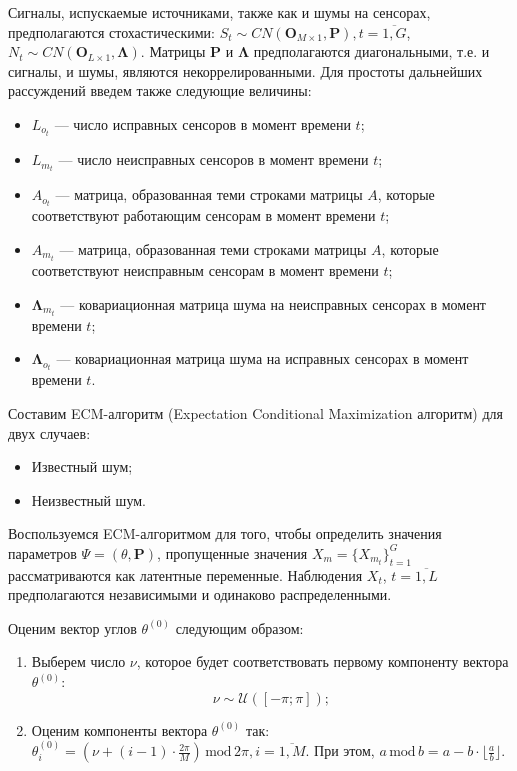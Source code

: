 \documentclass[11pt]{article}
\begin{document}
Сигналы, испускаемые источниками, также как и шумы на сенсорах, предполагаются стохастическими: $S_t \sim CN(\mathbf{O}_{M \times 1},\mathbf{P}),t=\overline{1,G}$, $N_t \sim CN(\mathbf{O}_{L \times 1}, \mathbf{\Lambda})$. Матрицы $\mathbf{P}$ и $\mathbf{\Lambda}$ предполагаются диагональными, т.е. и сигналы, и шумы, являются некоррелированными. Для простоты дальнейших рассуждений введем также следующие величины:
\begin{itemize}
\item
$L_{o_t}$ --- число исправных сенсоров в момент времени $t$;
\item
 $L_{m_t}$ --- число неисправных сенсоров в момент времени $t$;
\item 
$A_{o_t}$ --- матрица, образованная теми строками матрицы $A$, которые соответствуют работающим сенсорам в момент времени $t$; 
\item
$A_{m_t}$ --- матрица, образованная теми строками матрицы $A$, которые соответствуют неисправным сенсорам в момент времени $t$;
\item
$\mathbf{\Lambda}_{m_t}$ --- ковариационная матрица шума на неисправных сенсорах в момент времени $t$;
\item 
 $\mathbf{\Lambda}_{o_t}$ --- ковариационная матрица шума на исправных сенсорах в момент времени $t$.
\end{itemize}
Составим ECM-алгоритм (Expectation Conditional Maximization алгоритм) для двух случаев:
\begin{itemize}
\item
Известный шум;
\item
Неизвестный шум.
\end{itemize}
\clearpage
\begin{center}
\fontsize{16}{20}\selectfont {}
\end{center}
Воспользуемся ECM-алгоритмом для того, чтобы определить значения параметров $\Psi = (\theta, \mathbf{P})$, пропущенные значения $X_m=\{X_{m_t}\}_{t=1}^G$ рассматриваются как латентные переменные. Наблюдения $X_t$, $t=\overline{1,L}$ предполагаются независимыми и одинаково распределенными.
\begin{center}
\fontsize{14}{18}\selectfont {}
\end{center}
Оценим вектор углов $\theta^{(0)}$ следующим образом:
\begin{enumerate}
\item
Выберем число $\nu$, которое будет соответствовать первому компоненту вектора $\theta^{(0)}$:
\begin{equation}
\nu \sim \mathcal{U}([-\pi;\pi]);
\end{equation}
\item
Оценим компоненты вектора $\theta^{(0)}$ так:  $\theta^{(0)}_i = (\nu + (i-1)\cdot \frac{2\pi}{M})\, \text{mod} \, 2\pi, i = \overline{1,M}$. При этом,  $a \, \text{mod} \, b = a - b \cdot \lfloor \frac{a}{b} \rfloor$.
\end{enumerate}
\end{document}
